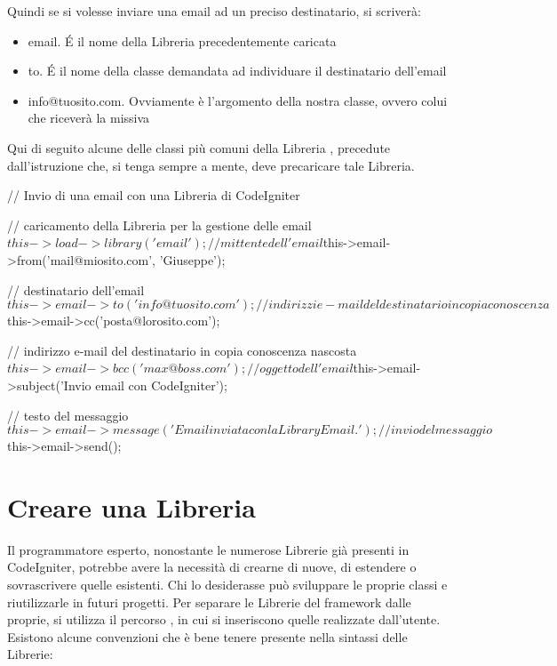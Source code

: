 Quindi se si volesse inviare una email ad un preciso destinatario, si scriverà:


\begin{itemize}
\item email. \'E il nome della Libreria precedentemente caricata
\item to. \'E il nome della classe demandata ad individuare il destinatario dell'email
\item info@tuosito.com. Ovviamente è l'argomento della nostra classe, ovvero colui che riceverà la missiva
\end{itemize}

Qui di seguito alcune delle classi più comuni della Libreria , precedute dall'istruzione che, si tenga sempre a mente, deve precaricare tale Libreria.

\begin{code}
// Invio di una email con una Libreria di CodeIgniter

// caricamento della Libreria per la gestione delle email
$this->load->library('email');

// mittente dell'email
$this->email->from('mail@miosito.com', 'Giuseppe');

// destinatario dell'email
$this->email->to('info@tuosito.com');

// indirizzi e-mail del destinatario in copia conoscenza
$this->email->cc('posta@lorosito.com');

// indirizzo e-mail del destinatario in copia conoscenza nascosta
$this->email->bcc('max@boss.com');

// oggetto dell'email
$this->email->subject('Invio email con CodeIgniter');

// testo del messaggio
$this->email->message('Email inviata con la Library Email.');

// invio del messaggio
$this->email->send();
\end{code}

\section*{Creare una Libreria}
Il programmatore esperto, nonostante le numerose Librerie già presenti in CodeIgniter, potrebbe avere la necessità di crearne di nuove, di estendere o sovrascrivere quelle esistenti. Chi lo desiderasse può sviluppare le proprie classi e riutilizzarle in futuri progetti. Per separare le Librerie del framework dalle proprie, si utilizza il percorso , in cui si inseriscono quelle realizzate dall'utente. Esistono alcune convenzioni che è bene tenere presente nella sintassi delle Librerie:

